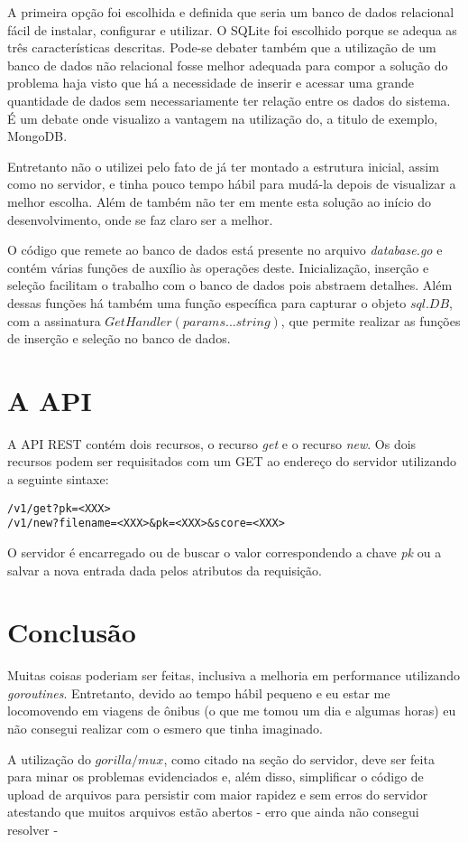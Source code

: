 \documentclass[a4paper, 12pt]{article}
\begin{document}
A primeira opção foi escolhida e definida que seria um banco de dados relacional
fácil de instalar, configurar e utilizar. O SQLite foi escolhido porque se
adequa as três características descritas. Pode-se debater também que a
utilização de um banco de dados não relacional fosse melhor adequada para compor
a solução do problema haja visto que há a necessidade de inserir e acessar uma
grande quantidade de dados sem necessariamente ter relação entre os dados do
sistema. É um debate onde visualizo a vantagem na utilização do, a titulo de
exemplo, MongoDB.

Entretanto não o utilizei pelo fato de já ter montado a estrutura inicial, assim
como no servidor, e tinha pouco tempo hábil para mudá-la depois de visualizar a
melhor escolha. Além de também não ter em mente esta solução ao início do
desenvolvimento, onde se faz claro ser a melhor.

O código que remete ao banco de dados está presente no arquivo \emph{database.go} e
contém várias funções de auxílio às operações deste. Inicialização, inserção e
seleção facilitam o trabalho com o banco de dados pois abstraem detalhes. Além
dessas funções há também uma função específica para capturar o objeto \(sql.DB\),
com a assinatura \(GetHandler(params ...string)\), que permite realizar as funções
de inserção e seleção no banco de dados.

\section{A API}
\label{sec:org7920272}

A API REST contém dois recursos, o recurso \emph{get} e o recurso \emph{new}. Os dois
recursos podem ser requisitados com um GET ao endereço do servidor utilizando
a seguinte sintaxe:

\begin{verbatim}
/v1/get?pk=<XXX>
/v1/new?filename=<XXX>&pk=<XXX>&score=<XXX>
\end{verbatim}

O servidor é encarregado ou de buscar o valor correspondendo a chave \emph{pk} ou
a salvar a nova entrada dada pelos atributos da requisição.

\section{Conclusão}
\label{sec:orgd4d71a2}

Muitas coisas poderiam ser feitas, inclusiva a melhoria em performance utilizando
\emph{goroutines}. Entretanto, devido ao tempo hábil pequeno e eu estar me locomovendo
em viagens de ônibus (o que me tomou um dia e algumas horas) eu não consegui
realizar com o esmero que tinha imaginado.

A utilização do \(gorilla/mux\), como citado na seção do servidor, deve ser feita
para minar os problemas evidenciados e, além disso, simplificar o código de
upload de arquivos para persistir com maior rapidez e sem erros do servidor
atestando que muitos arquivos estão abertos - erro que ainda não consegui
resolver -
\end{document}
